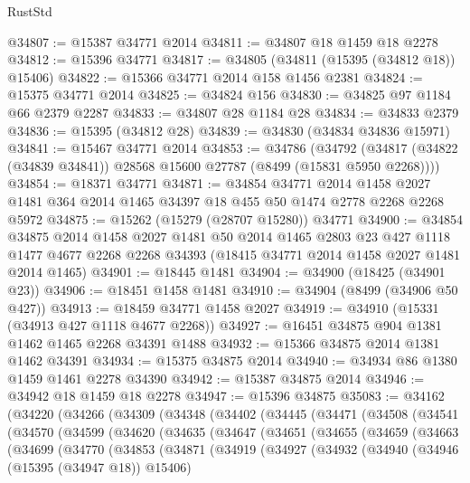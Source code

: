 \begin{lexlean}{RustStd}
\begin{coremodule}
@34807 := @15387 @34771 @2014
@34811 := @34807 @18 @1459 @18 @2278
@34812 := @15396 @34771
@34817 := @34805 (@34811 (@15395 (@34812 @18)) @15406)
@34822 := @15366 @34771 @2014 @158 @1456 @2381
@34824 := @15375 @34771 @2014
@34825 := @34824 @156
@34830 := @34825 @97 @1184 @66 @2379 @2287
@34833 := @34807 @28 @1184 @28
@34834 := @34833 @2379
@34836 := @15395 (@34812 @28)
@34839 := @34830 (@34834 @34836 @15971)
@34841 := @15467 @34771 @2014
@34853 := @34786
    (@34792 (@34817 (@34822 (@34839 @34841)) @28568 @15600 @27787 (@8499 (@15831 @5950 @2268))))
@34854 := @18371 @34771
@34871 := @34854
    @34771
    @2014
    @1458
    @2027
    @1481
    @364
    @2014
    @1465
    @34397
    @18
    @455
    @50
    @1474
    @2778
    @2268
    @2268
    @5972
@34875 := @15262 (@15279 (@28707 @15280)) @34771
@34900 := @34854
    @34875
    @2014
    @1458
    @2027
    @1481
    @50
    @2014
    @1465
    @2803
    @23
    @427
    @1118
    @1477
    @4677
    @2268
    @2268
    @34393
    (@18415 @34771 @2014 @1458 @2027 @1481 @2014 @1465)
@34901 := @18445 @1481
@34904 := @34900 (@18425 (@34901 @23))
@34906 := @18451 @1458 @1481
@34910 := @34904 (@8499 (@34906 @50 @427))
@34913 := @18459 @34771 @1458 @2027
@34919 := @34910 (@15331 (@34913 @427 @1118 @4677 @2268))
@34927 := @16451 @34875 @904 @1381 @1462 @1465 @2268 @34391 @1488
@34932 := @15366 @34875 @2014 @1381 @1462 @34391
@34934 := @15375 @34875 @2014
@34940 := @34934 @86 @1380 @1459 @1461 @2278 @34390
@34942 := @15387 @34875 @2014
@34946 := @34942 @18 @1459 @18 @2278
@34947 := @15396 @34875
@35083 := @34162
    (@34220
      (@34266
        (@34309
          (@34348
            (@34402
              (@34445
                (@34471
                  (@34508
                    (@34541
                      (@34570
                        (@34599
                          (@34620
                            (@34635
                              (@34647
                                (@34651
                                  (@34655
                                    (@34659
                                      (@34663
                                        (@34699
                                          (@34770
                                            (@34853
                                              (@34871
                                                (@34919
                                                  (@34927
                                                    (@34932
                                                      (@34940
                                                        (@34946 (@15395 (@34947 @18)) @15406)

\end{coremodule}
\end{lexlean}
